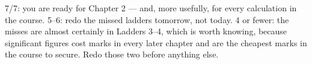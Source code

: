 \documentclass{apchem-worksheet}
\begin{document}
\begin{apcnote}
7/7: you are ready for Chapter 2 --- and, more usefully, for every
calculation in the course. 5--6: redo the missed ladders tomorrow, not
today. 4 or fewer: the misses are almost certainly in Ladders 3--4,
which is worth knowing, because significant figures cost marks in every
later chapter and are the cheapest marks in the course to secure. Redo
those two before anything else.
\end{apcnote}
\end{document}
